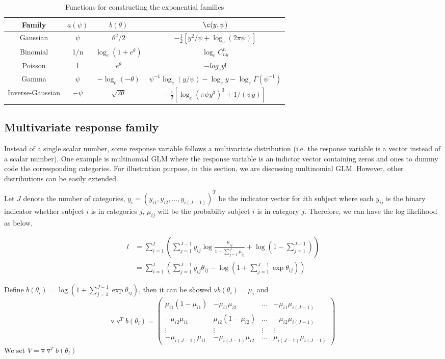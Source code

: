 \begin{table}[h]
\centering
\begin{tabular}{cccc}
Family & $a(\psi)$ & $b(\theta)$ & $\c(y, \psi)$ \\
\hline
Gaussian & $\psi$ & $\theta^2/2$ & $-\frac{1}{2}\left[y^2/\psi+\log_e(2\pi\psi)\right]$ \\
Binomial & 1/n & $\log_e(1+e^\theta)$ & $\log_eC^n_{ny}$ \\
Poisson & 1 & $e^\theta$ & $-log_ey!$ \\
Gamma & $\psi$ & $-\log_e(-\theta)$ & $\psi^{-1}\log_e(y/\psi) - \log_ey - \log_e\Gamma(\psi^{-1})$ \\
Inverse-Gaussian & $-\psi$ & $\sqrt{2\theta}$ & $-\frac{1}{2}\left[\log_e(\pi\psi y^3)^3 + 1/(\psi y) \right]$ \\
\end{tabular}
\caption{Functions for constructing the exponential families}
\label{tab:glm_func}
\end{table}

\subsection{Multivariate response family}
\label{subsec::multinomreg}
Instead of a single scalar number, some response variable follows a multivariate distribution (i.e. the response variable is a vector instead of a scalar number). One example is multinomial GLM where the response variable is an indictor vector containing zeros and ones to dummy code the corresponding categories. For illustration purpose, in this section, we are discussing multinomial GLM. However, other distributions can be easily extended.

Let $J$ denote the number of categories, $y_i=(y_{i1}, y_{i2}, ..., y_{i(J-1)})^T$ be the indicator vector for $i$th subject where each $y_{ij}$ is the binary indicator whether subject $i$ is in categories $j$, $\mu_{ij}$ will be the probabilty subject $i$ is in category $j$. Therefore, we can have the log likelihood as below,

\begin{align*}
l & = \sum_{i=1}^{I} \left(\sum_{j=1}^{J-1} y_{ij} \log{\frac{\mu_{ij}}{1-\sum_{j=1}^{J}\mu_{ij}}} + \log(1-\sum_{j=1}^{J-1}) \right)\\
 & = \sum_{i=1}^I \left( \sum_{j=1}^{J-1} y_{ij} \theta_{ij} - \log(1+\sum_{j=1}^{J-1}\exp\theta_{ij}) \right)
\end{align*}

Define $b(\theta_i) = \log(1+\sum_{j=1}^{J-1}\exp\theta_{ij})$, then it can be showed $\triangledown b(\theta_i) = \mu_i$ and
\[
\triangledown \triangledown^T b(\theta_i) = \left( \begin{array}{cccc}
\mu_{i1}(1-\mu_{i1}) & -\mu_{i1}\mu_{i2} & ... & -\mu_{i1}\mu_{i(J-1)} \\
-\mu_{i2}\mu_{i1} & \mu_{i2}(1-\mu_{i2}) & ... & -\mu_{i2}\mu_{i(J-1)} \\
\vdots & \vdots & \vdots & \vdots \\
-\mu_{i(J-1)}\mu_{i1} & -\mu_{i(J-1)}\mu_{i2} & ... & \mu_{i(J-1)}\mu_{i(J-1)}
\end{array} \right)
\]
We set $V = \triangledown \triangledown^T b(\theta_i)$

